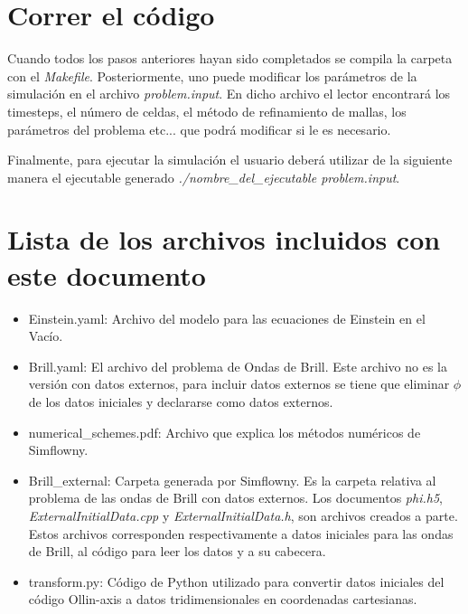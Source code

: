 \documentclass[11pt]{article}
\begin{document}
\section{Correr el código}
Cuando todos los pasos anteriores hayan sido completados se compila la carpeta con el {\itshape Makefile}. Posteriormente, uno puede modificar los parámetros de la simulación en el archivo {\itshape problem.input}. En dicho archivo el lector encontrará los timesteps, el número de celdas, el método de refinamiento de mallas, los parámetros del problema etc... que podrá modificar si le es necesario.

Finalmente, para ejecutar la simulación el usuario deberá utilizar de la siguiente manera el ejecutable generado  {\itshape ./nombre\_del\_ejecutable problem.input}.
\section{Lista de los archivos incluidos con este documento}
\begin{itemize}
\item Einstein.yaml: Archivo del modelo para las ecuaciones de Einstein en el Vacío.
\item Brill.yaml: El archivo del problema de Ondas de Brill. Este archivo no es la versión con datos externos, para incluir datos externos se tiene que eliminar $\phi$ de los datos iniciales y declararse como datos externos.
\item numerical\_schemes.pdf: Archivo que explica los métodos numéricos de Simflowny.
\item Brill\_external: Carpeta generada por Simflowny. Es la carpeta relativa al problema de las ondas de Brill con datos externos. Los documentos {\itshape phi.h5}, {\itshape ExternalInitialData.cpp} y {\itshape ExternalInitialData.h}, son archivos creados a parte. Estos archivos corresponden respectivamente a datos iniciales para las ondas de Brill, al código para leer los datos y a su cabecera.
\item transform.py: Código de Python utilizado para convertir datos iniciales del código Ollin-axis a datos tridimensionales en coordenadas cartesianas.
\end{itemize}
\end{document}
